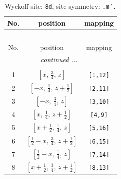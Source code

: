 \documentclass[fleqn,8pt]{jsarticle}
\begin{document}
\begin{longtable}{ccc}
\caption{Wyckoff site: {\tt 8d}, site symmetry: {\tt .m'.}}
 \\
 \hline \hline
No. & position & mapping \\ \hline \endfirsthead

\multicolumn{2}{l}{\tablename\ \thetable{}} \\
 \hline \hline
No. & position & mapping \\ \hline \endhead

 \hline \hline
\multicolumn{2}{r}{\footnotesize\it continued ...} \\ \endfoot

 \hline \hline
\multicolumn{2}{r}{} \\ \endlastfoot

1 & $\left[ x,\, \frac{3}{4},\, z \right]$ & {\tt [1,12]} \\ \hline
2 & $\left[ - x,\, \frac{1}{4},\, z + \frac{1}{2} \right]$ & {\tt [2,11]} \\ \hline
3 & $\left[ - x,\, \frac{3}{4},\, z \right]$ & {\tt [3,10]} \\ \hline
4 & $\left[ x,\, \frac{1}{4},\, z + \frac{1}{2} \right]$ & {\tt [4,9]} \\ \hline
5 & $\left[ x + \frac{1}{2},\, \frac{1}{4},\, z \right]$ & {\tt [5,16]} \\ \hline
6 & $\left[ \frac{1}{2} - x,\, \frac{3}{4},\, z + \frac{1}{2} \right]$ & {\tt [6,15]} \\ \hline
7 & $\left[ \frac{1}{2} - x,\, \frac{1}{4},\, z \right]$ & {\tt [7,14]} \\ \hline
8 & $\left[ x + \frac{1}{2},\, \frac{3}{4},\, z + \frac{1}{2} \right]$ & {\tt [8,13]} \\
\end{longtable}
\renewcommand{\arraystretch}{1.2}
\end{document}
